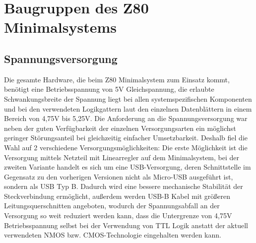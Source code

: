 \section{Baugruppen des Z80 Minimalsystems}
\label{sec:z80-baugruppen}
\subsection{Spannungsversorgung}
Die gesamte Hardware, die beim Z80 Minimalsystem zum Einsatz kommt, benötigt eine Betriebsspannung von 5V Gleichspannung, die erlaubte Schwankungsbreite der Spannung liegt bei allen systemspezifischen Komponenten und bei den verwendeten Logikgattern laut den einzelnen Datenblättern in einem Bereich von 4,75V bis 5,25V. Die Anforderung an die Spannungsversorgung war neben der guten Verfügbarkeit der einzelnen Versorgungsarten ein möglichst geringer Störungsanteil bei gleichzeitig einfacher Umsetzbarkeit. Deshalb fiel die Wahl auf 2 verschiedene Versorgungsmöglichkeiten: Die erste Möglichkeit ist die Versorgung mittels Netzteil mit Linearregler auf dem Minimalsystem, bei der zweiten Variante handelt es sich um eine USB-Versorgung, deren Schnittstelle im Gegensatz zu den vorherigen Versionen nicht als Micro-USB ausgeführt ist, sondern als USB Typ B. Dadurch wird eine bessere mechanische Stabilität der Steckverbindung ermöglicht, außerdem werden USB-B Kabel mit größeren Leitungsquerschnitten angeboten, wodurch der Spannungsabfall an der Versorgung so weit reduziert werden kann, dass die Untergrenze von 4,75V Betriebsspannung selbst bei der Verwendung von TTL Logik anstatt der aktuell verwendeten NMOS bzw. CMOS-Technologie eingehalten werden kann.

